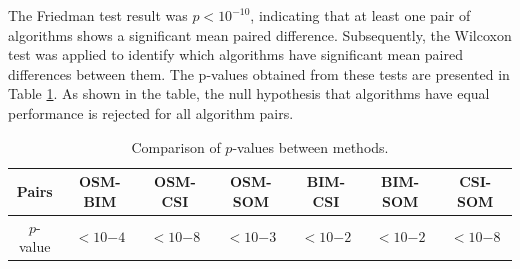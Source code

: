 \documentclass{IEEEtran}
\begin{document}
                The Friedman test result was $p < 10^{-10}$, indicating that at least one pair of algorithms shows a significant mean paired difference. Subsequently, the Wilcoxon test was applied to identify which algorithms have significant mean paired differences between them. The p-values obtained from these tests are presented in Table \ref{tab:shape:average:pvalue}. As shown in the table, the null hypothesis that algorithms have equal performance is rejected for all algorithm pairs.

                \begin{table}
                    \centering
                    \renewcommand{\arraystretch}{1.5}
                    \caption{Comparison of $p$-values between methods.}
                    \label{tab:shape:average:pvalue}
                    \begin{tabular}{ccccccc}
                        Pairs & OSM-BIM & OSM-CSI & OSM-SOM & BIM-CSI & BIM-SOM & CSI-SOM \\\hline
                        $p$-value & $<10{-4}$ & $<10{-8}$ & $<10{-3}$ & $<10{-2}$ & $<10{-2}$ & $<10{-8}$ \\  
                    \end{tabular}
                \end{table}

\end{document}
